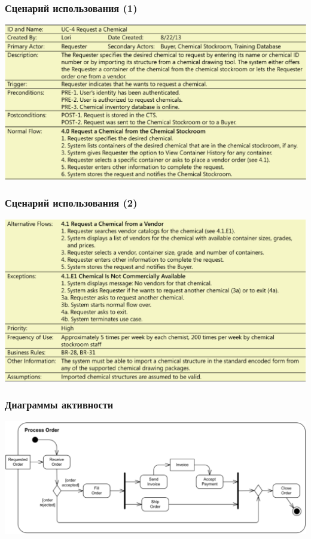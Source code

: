 \documentclass{../../slides-style}
\begin{document}
    \begin{frame}
        \frametitle{Сценарий использования (1)}
        \begin{center}
            \includegraphics[width=\textwidth]{userScenario1.png}
        \end{center}
    \end{frame}

    \begin{frame}
        \frametitle{Сценарий использования (2)}
        \begin{center}
            \includegraphics[width=\textwidth]{userScenario2.png}
        \end{center}
    \end{frame}

    \begin{frame}
        \frametitle{Диаграммы активности}
        \begin{center}
            \includegraphics[width=\textwidth]{activity.png}
        \end{center}
    \end{frame}
\end{document}
